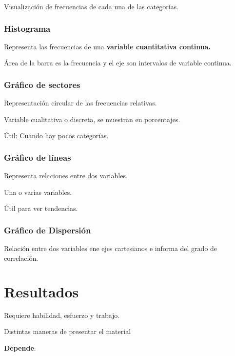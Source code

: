\documentclass[12pt]{report} %
\begin{document}
Visualización de frecuencias de cada una de las categorías.

\hypertarget{histograma}{%
\subsubsection{Histograma}\label{histograma}}

Representa las frecuencias de una \textbf{variable cuantitativa
continua.}

Área de la barra es la frecuencia y el eje son intervalos de variable
continua.

\hypertarget{gruxe1fico-de-sectores}{%
\subsubsection{Gráfico de sectores}\label{gruxe1fico-de-sectores}}

Representación circular de las frecuencias relativas.

Variable cualitativa o discreta, se muestran en porcentajes.

Útil: Cuando hay pocos categorías.

\hypertarget{gruxe1fico-de-luxedneas}{%
\subsubsection{Gráfico de líneas}\label{gruxe1fico-de-luxedneas}}

Representa relaciones entre dos variables.

Una o varias variables.

Útil para ver tendencias.

\hypertarget{gruxe1fico-de-dispersiuxf3n}{%
\subsubsection{Gráfico de
Dispersión}\label{gruxe1fico-de-dispersiuxf3n}}

Relación entre dos variables ene ejes cartesianos e informa del grado de
correlación.

\section{Resultados}

Requiere habilidad, esfuerzo y trabajo.

Distintas maneras de presentar el material

\textbf{Depende}:
\end{document}
